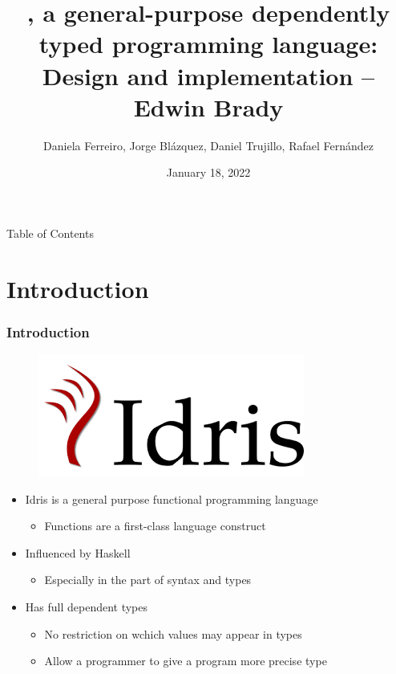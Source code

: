 \documentclass{beamer}
\title{\Idris, a general-purpose dependently typed programming language: Design and implementation -- Edwin Brady}
\author{Daniela Ferreiro, Jorge Blázquez, Daniel Trujillo, Rafael Fernández}
\date{January 18, 2022}
\begin{document}
\frame{\titlepage}

\begin{frame}{Table of Contents}
	\tableofcontents
\end{frame}
\newcommand{\intro}{Introduction}
\section{\intro}
\label{sec:intro}

\begin{frame}
	\frametitle{\intro}
	\begin{figure}
		\includegraphics[width=0.3\linewidth]{pics/idris.png}
		\label{fig:boat1}
	\end{figure}
	\begin{itemize}
		\setlength\itemsep{1em} 
		\item Idris is a general purpose functional programming language
		\begin{itemize}
			\item Functions are a first-class language construct
		\end{itemize}  
		\item Influenced by Haskell
		\begin{itemize}
			\item Especially in the part of syntax and types
		\end{itemize}   
		\item Has full dependent types
		\begin{itemize}
			\item No restriction on wchich values may appear in types
			\item Allow a programmer to give a program more precise type
		\end{itemize}   
	\end{itemize}
\end{frame}

\newcommand{\dependentTypes}{Dependent Types}
\end{document}
